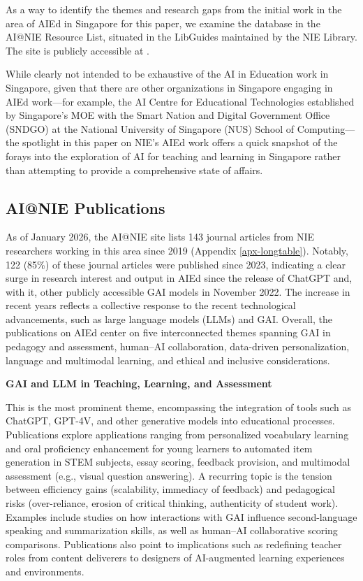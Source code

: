 \documentclass[english]{textolivre}
\begin{document}
As a way to identify the themes and research gaps from the initial work in the area of AIEd in Singapore for this paper, we examine the database in the AI@NIE Resource List, situated in the LibGuides maintained by the NIE Library. The site is publicly accessible at \textcite{NIE2026}.

While clearly not intended to be exhaustive of the AI in Education work in Singapore, given that there are other organizations in Singapore engaging in AIEd work—for example, the AI Centre for Educational Technologies established by Singapore’s MOE with the Smart Nation and Digital Government Office (SNDGO) at the National University of Singapore (NUS) School of Computing—the spotlight in this paper on NIE’s AIEd work offers a quick snapshot of the forays into the exploration of AI for teaching and learning in Singapore rather than attempting to provide a comprehensive state of affairs.


\subsection{AI@NIE Publications}\label{sec-modelo}
As of January 2026, the AI@NIE site lists 143 journal articles from NIE researchers working in this area since 2019 (Appendix \ref{apx-longtable}). Notably, 122 (85\%) of these journal articles were published since 2023, indicating a clear surge in research interest and output in AIEd since the release of ChatGPT and, with it, other publicly accessible GAI models in November 2022. The increase in recent years reflects a collective response to the recent technological advancements, such as large language models (LLMs) and GAI. Overall, the publications on AIEd center on five interconnected themes spanning GAI in pedagogy and assessment, human–AI collaboration, data-driven personalization, language and multimodal learning, and ethical and inclusive considerations.

\textbf{GAI and LLM in Teaching, Learning, and Assessment}

    This is the most prominent theme, encompassing the integration of tools such as ChatGPT, GPT-4V, and other generative models into educational processes. Publications explore applications ranging from personalized vocabulary learning and oral proficiency enhancement for young learners to automated item generation in STEM subjects, essay scoring, feedback provision, and multimodal assessment (e.g., visual question answering). A recurring topic is the tension between efficiency gains (scalability, immediacy of feedback) and pedagogical risks (over-reliance, erosion of critical thinking, authenticity of student work). Examples include studies on how interactions with GAI influence second-language speaking and summarization skills, as well as human–AI collaborative scoring comparisons. Publications also point to implications such as redefining teacher roles from content deliverers to designers of AI-augmented learning experiences and environments.
\end{document}
